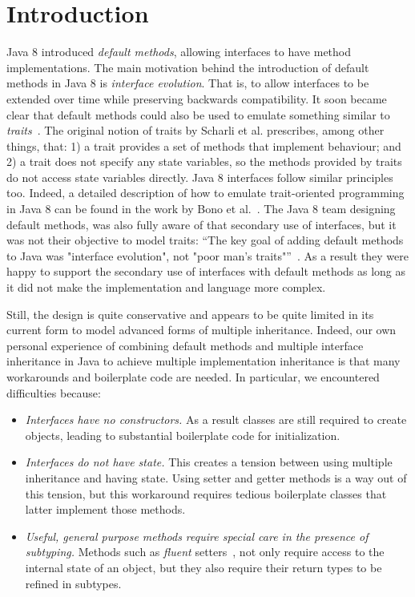 \section{Introduction}\label{sec:intro}

Java 8 introduced \emph{default methods}, allowing interfaces to have
method implementations. The main motivation behind the introduction of
default methods in Java 8 is \emph{interface evolution}. That is, to
allow interfaces to be extended over time while preserving backwards
compatibility. It soon became clear that default methods could also be
used to emulate something similar to \emph{traits}~\cite{scharli03traits}. The
original notion of traits by Scharli et al. prescribes, among other
things, that: 1) a trait provides a set of methods that implement
behaviour; and 2) a trait does not specify any state variables, so the
methods provided by traits do not access state variables
directly. Java 8 interfaces follow similar principles too. Indeed, a
detailed description of how to emulate trait-oriented programming in
Java 8 can be found in the work by Bono et al.~\cite{bono14}. The Java 8
team designing default methods, was also fully aware of that secondary
use of interfaces, but it was not their objective to model traits:
``The key goal of adding default methods to Java was "interface
evolution", not "poor man's traits"''~\cite{goetz13default}. As a result
they were happy to support the secondary use of interfaces with
default methods as long as it did not make the implementation and
language more complex.
 
Still, the design is quite conservative and appears to be quite limited
 in its current form to model advanced forms of multiple inheritance.
Indeed, our own personal experience of combining default methods 
and multiple interface inheritance in Java to achieve multiple implementation 
inheritance is that many workarounds and boilerplate code are needed. 
In particular, we encountered difficulties because:

\begin{itemize}

\item {\em Interfaces have no constructors.} As a result classes are 
still required to create objects, leading to substantial boilerplate 
code for initialization.

\item {\em Interfaces do not have state.} This creates a tension between 
 using multiple inheritance and having state. Using setter and
  getter methods is a way out of this tension, but this workaround
  requires tedious boilerplate classes that latter implement those
  methods.

\item {\em Useful, general purpose methods require special care in
  the presence of subtyping.} Methods such as
  \emph{fluent} setters~\cite{fowler2005fluentinterface}, not only require access to the
  internal state of an object, but they also require their return types to be
  refined in subtypes.

\end{itemize}

